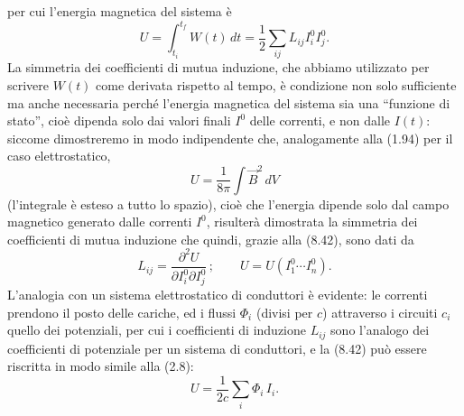 per cui l'energia magnetica del sistema \`e
\begin{equation}
  U=\int_{t_i}^{t_f}W(t)\,dt=\frac{1}{2}\textstyle\sum_{ij}L_{ij}I_i^0I_j^0.
  \tag{8.42}
\end{equation}
La simmetria dei coefficienti di mutua induzione, che abbiamo utilizzato per
scrivere $W(t)$ come derivata rispetto al tempo, \`e condizione non solo
sufficiente ma anche necessaria perch\'e l'energia magnetica del sistema sia una
``funzione di stato'', cio\`e dipenda solo dai valori finali $I^0$ delle
correnti, e non dalle $I(t)$: siccome dimostreremo in modo indipendente che,
analogamente alla (1.94) per il caso elettrostatico,
\begin{equation}
  U=\frac{1}{8\pi}\int\vec B^2\,dV
  \tag{8.43}
\end{equation}
(l'integrale \`e esteso a tutto lo spazio), cio\`e che l'energia dipende solo
dal campo magnetico generato dalle correnti $I^0$, risulter\`a dimostrata la
simmetria dei coefficienti di
mutua induzione che quindi, grazie alla (8.42), sono dati da
\begin{equation}
  L_{ij}=\frac{\partial^2U}{\partial I_i^0\partial I_j^0}\,;\qquad
  U=U(I_1^0\cdots I_n^0).
  \tag{8.44}
\end{equation}
L'analogia con un sistema elettrostatico di conduttori \`e evidente: le correnti
prendono il posto delle cariche, ed i flussi $\Phi_i$ (divisi per $c$)
attraverso i circuiti $c_i$ quello dei potenziali, per cui i coefficienti di
induzione $L_{ij}$ sono l'analogo dei coefficienti di potenziale per un sistema
di conduttori, e la (8.42) pu\`o essere riscritta in modo simile alla (2.8):
\begin{equation}
  U=\frac{1}{2c}\sum_i\Phi_i\,I_i.
  \tag{8.45}
\end{equation}

